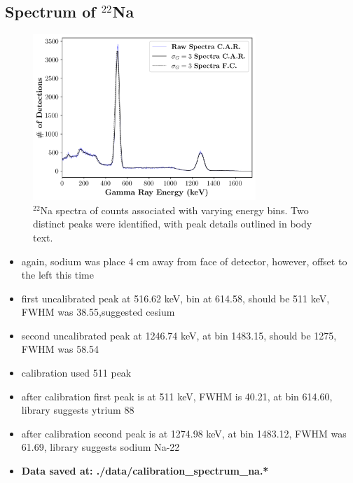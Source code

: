 \documentclass[a4paper]{article}
\begin{document}
\subsection{Spectrum of $^{22}$Na}
\begin{figure}[H]
    \centering
    \includegraphics[width=0.75\textwidth]{figures/calibration_spectrum_na_counts_overlay_both_mca.png}
    \caption{$^{22}$Na spectra of counts associated with varying energy bins. Two distinct peaks were identified, with peak details outlined in body text.}
\end{figure}
\begin{itemize}
    \item again, sodium was place 4 cm away from face of detector, however, offset to the left this time
    \item first uncalibrated peak at 516.62 keV, bin at 614.58, should be 511 keV, FWHM was 38.55,suggested cesium
    \item second uncalibrated peak at 1246.74 keV, at bin 1483.15, should be 1275, FWHM was 58.54
    \item calibration used 511 peak
    \item after calibration first peak is at 511 keV, FWHM is 40.21, at bin 614.60, library suggests ytrium 88
    \item after calibration second peak is at 1274.98 keV, at bin 1483.12, FWHM was 61.69, library suggests sodium Na-22
    \item \textbf{Data saved at: ./data/calibration\_spectrum\_na.*}
\end{itemize}
\end{document}
